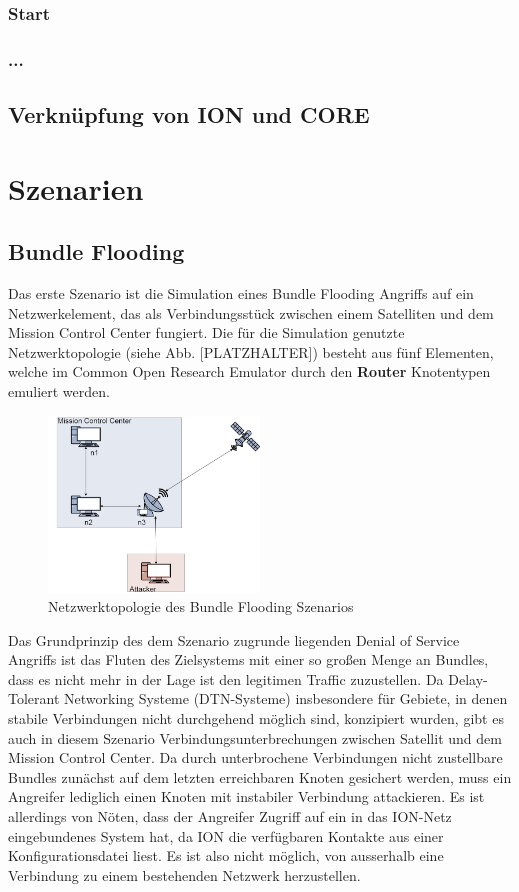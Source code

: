 \documentclass{article}
\begin{document}
\subsubsection{Start}
\subsubsection{...}
\subsection{Verknüpfung von ION und CORE}
\section{Szenarien}
\subsection{Bundle Flooding}
Das erste Szenario ist die Simulation eines Bundle Flooding Angriffs auf ein Netzwerkelement, das als Verbindungsstück zwischen einem Satelliten und dem Mission Control Center fungiert. Die für die Simulation genutzte Netzwerktopologie (siehe Abb. [PLATZHALTER]) besteht aus fünf Elementen, welche im Common Open Research Emulator durch den \textbf{Router} Knotentypen emuliert werden.\par
\begin{figure}[h]
\centering
\includegraphics[width=0.5\textwidth]{flooding}
\caption{Netzwerktopologie des Bundle Flooding Szenarios}
\end{figure}
Das Grundprinzip des dem Szenario zugrunde liegenden Denial of Service Angriffs ist das Fluten des Zielsystems mit einer so großen Menge an Bundles, dass es nicht mehr in der Lage ist den legitimen Traffic zuzustellen. Da Delay-Tolerant Networking Systeme (DTN-Systeme) insbesondere für Gebiete, in denen stabile Verbindungen nicht durchgehend möglich sind, konzipiert wurden, gibt es auch in diesem Szenario Verbindungsunterbrechungen zwischen Satellit und dem Mission Control Center. Da durch unterbrochene Verbindungen nicht zustellbare Bundles zunächst auf dem letzten erreichbaren Knoten gesichert werden, muss ein Angreifer lediglich einen Knoten mit instabiler Verbindung attackieren. Es ist allerdings von Nöten, dass der Angreifer Zugriff auf ein in das ION-Netz eingebundenes System hat, da ION die verfügbaren Kontakte aus einer Konfigurationsdatei liest. Es ist also nicht möglich, von ausserhalb eine Verbindung zu einem bestehenden Netzwerk herzustellen.\par
\end{document}
